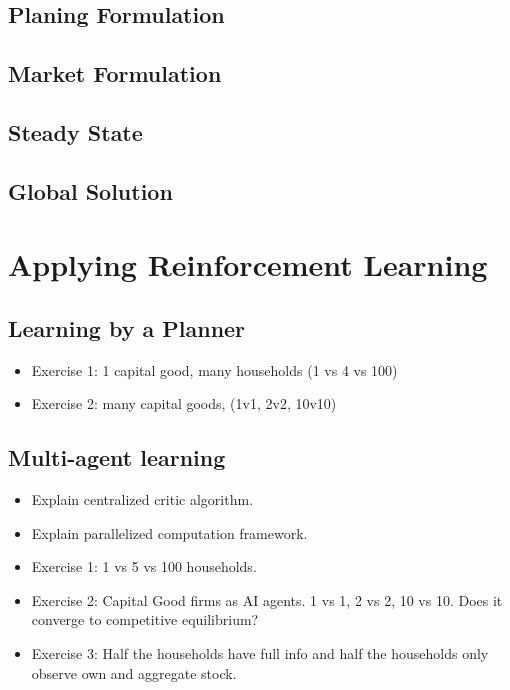 \documentclass[11pt,english]{article}
\begin{document}
\subsection{Planing Formulation}

\subsection{Market Formulation}

\subsection{Steady State}

\subsection{Global Solution}

\section{Applying Reinforcement Learning}


\subsection{Learning by a Planner}

\begin{itemize}
	\item Exercise 1: 1 capital good, many households (1 vs 4 vs 100)
	\item Exercise 2: many capital goods, (1v1, 2v2, 10v10)
\end{itemize}

\subsection{Multi-agent learning}
\begin{itemize}
	\item Explain centralized critic algorithm.
	\item Explain parallelized computation framework.
	\item Exercise 1: 1 vs 5 vs 100 households.
	\item Exercise 2: Capital Good firms as AI agents. 1 vs 1, 2 vs 2, 10 vs 10. Does it converge to competitive equilibrium?	
	\item Exercise 3: Half the households have full info and half the households only observe own and aggregate stock.
\end{itemize}
\end{document}
